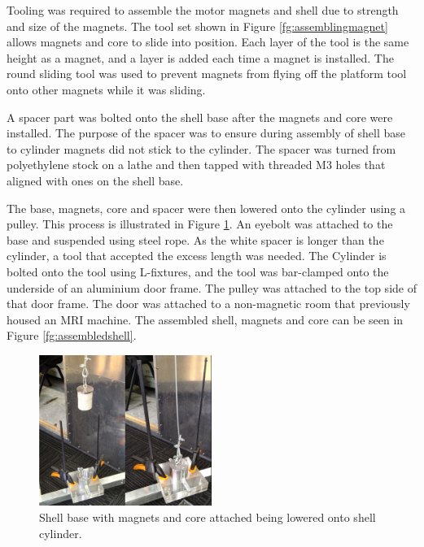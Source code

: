 \documentclass[a4paper,12pt]{article}
\begin{document}
Tooling was required to assemble the motor magnets and shell due to strength and size of the magnets. The tool set shown in Figure \ref{fg:assemblingmagnet} allows magnets and core to slide into position. Each layer of the tool is the same height as a magnet, and a layer is added each time a magnet is installed. The round sliding tool was used to prevent magnets from flying off the platform tool onto other magnets while it was sliding.

A spacer part was bolted onto the shell base after the magnets and core were installed. The purpose of the spacer was to ensure during assembly of shell base to cylinder magnets did not stick to the cylinder. The spacer was turned from polyethylene stock on a lathe and then tapped with threaded M3 holes that aligned with ones on the shell base.

The base, magnets, core and spacer were then lowered onto the cylinder using a pulley. This process is illustrated in Figure \ref{fg:assemblingshell}. An eyebolt was attached to the base and suspended using steel rope. As the white spacer is longer than the cylinder, a tool that accepted the excess length was needed. The Cylinder is bolted onto the tool using L-fixtures, and the tool was bar-clamped onto the underside of an aluminium door frame. The pulley was attached to the top side of that door frame. The door was attached to a non-magnetic room that previously housed an MRI machine. The assembled shell, magnets and core can be seen in Figure \ref{fg:assembledshell}.

\begin{figure}[h!]
    \centering
    \includegraphics[width=0.5\textwidth]{assemblingshell.jpg}
    \caption{Shell base with magnets and core attached being lowered onto shell cylinder.}
    \label{fg:assemblingshell}
\end{figure}
\end{document}
